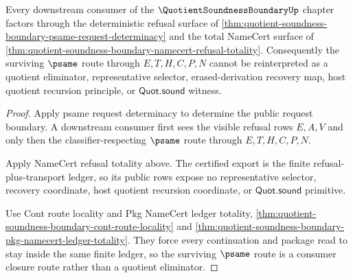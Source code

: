 \begin{theorem}
\label{thm:quotient-soundness-boundary-downstream-representative-nonescape}
Every downstream consumer of the $\QuotientSoundnessBoundaryUp$ chapter factors through the deterministic refusal surface of \autoref{thm:quotient-soundness-boundary-psame-request-determinacy} and the total NameCert surface of \autoref{thm:quotient-soundness-boundary-namecert-refusal-totality}. Consequently the surviving $\psame$ route through $E,T,H,C,P,N$ cannot be reinterpreted as a quotient eliminator, representative selector, erased-derivation recovery map, host quotient recursion principle, or $\mathsf{Quot.sound}$ witness.
\end{theorem}
\begin{proof}
Apply psame request determinacy to determine the public request boundary. A downstream consumer first sees the visible refusal rows $E,A,V$ and only then the classifier-respecting $\psame$ route through $E,T,H,C,P,N$.

Apply NameCert refusal totality above. The certified export is the finite refusal-plus-transport ledger, so its public rows expose no representative selector, recovery coordinate, host quotient recursion coordinate, or $\mathsf{Quot.sound}$ primitive.

Use Cont route locality and Pkg NameCert ledger totality, \autoref{thm:quotient-soundness-boundary-cont-route-locality} and \autoref{thm:quotient-soundness-boundary-pkg-namecert-ledger-totality}. They force every continuation and package read to stay inside the same finite ledger, so the surviving $\psame$ route is a consumer closure route rather than a quotient eliminator.
\end{proof}

